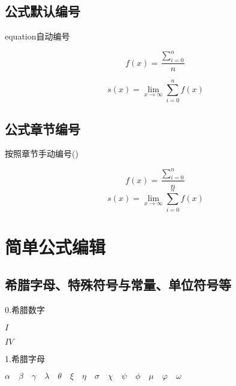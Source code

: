 \documentclass[withoutpreface,bwprint]{cumcmthesis}  %
\begin{document}
\subsection{公式默认编号}

\noindent equation自动编号

	\begin{equation}
		f(x)= \frac{\sum_{i=0}^{n}}{n}
	\end{equation}

	\begin{equation}
		s(x)= \lim_{x\rightarrow\infty}\sum_{i=0}^{n}f(x)
	\end{equation}


\subsection{公式章节编号}

\noindent 按照章节手动编号()

	\begin{equation}
		\tag{2-2-1}
		f(x)= \frac{\sum_{i=0}^{n}}{n}
	\end{equation}
	\begin{equation}
	\tag{2-2-2}
	s(x)= \lim_{x\rightarrow\infty}\sum_{i=0}^{n}f(x)
\end{equation}

\section{简单公式编辑}









	\subsection{希腊字母、特殊符号与常量、单位符号等}
	
	\noindent 0.希腊数字
	
	$ I $
	
		$ IV $
	
	\noindent 1.希腊字母
	
		$\alpha \quad \beta \quad \gamma \quad \lambda \quad \theta \quad \xi \quad \eta \quad \sigma \quad \chi \quad \psi \quad \phi \quad \mu \quad \varphi \quad \omega$
			
\end{document}
